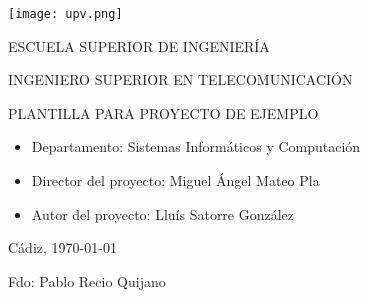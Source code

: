 

\begin{center}

  \texttt{[image: upv.png]} \\

  \vspace{2.0cm}

  \Large{ESCUELA SUPERIOR DE INGENIERÍA} \\

  \vspace{1.0cm}

  \large{INGENIERO SUPERIOR EN TELECOMUNICACIÓN} \\

  \vspace{2.0cm}

  \large{PLANTILLA PARA PROYECTO DE EJEMPLO} \\

  \vspace{1.0cm}

\end{center}

\begin{itemize}
\item \large{Departamento: Sistemas Informáticos y Computación}
\item \large{Director del proyecto: Miguel Ángel Mateo Pla}
\item \large{Autor del proyecto: Lluís Satorre González}
\end{itemize}

\vspace{1.0cm}

\begin{flushright}
  \large{Cádiz, \today} \\

  \vspace{2.5cm}

  \large{Fdo: Pablo Recio Quijano}
\end{flushright}
